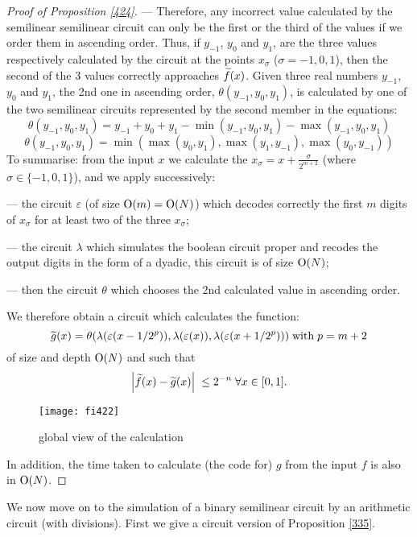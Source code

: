 \begin{proof}[Proof of Proposition \ref{424}]
\noindent 
--- Therefore, any incorrect value calculated by the semilinear 
semilinear circuit can only be the first or the third of the values if 
we order them in ascending order.
Thus, if $y_{-1}$, $y_0$ and $y_1$, are the three values respectively 
calculated by the circuit at the points $x_{\sigma}$ ($\sigma=-1,0,1$), 
then the second of the 3 values correctly approaches $\widetilde{f}(x)$. 
Given three real numbers $y_{-1}$, $y_0$ and $y_1$, the 2nd one in ascending order, $\theta(y_{-1},y_0,y_1)$, is calculated by one of the two semilinear circuits represented by the second member in the equations:
\[
\theta (y_{-1},y_0,y_1) = y_{-1}+y_0+y_1 - \min (y_{-1},y_0,y_1) - \max (y_{-1},y_0,y_1)
\]
\[
\theta (y_{-1},y_0,y_1) = \min (\max (y_0,y_1), \max (y_1,y_{-1}), \max (y_0,y_{-1}))
\]
To summarise: from the input $x$ we calculate the $x_{\sigma} = x +\frac \sigma {2^{m+2}}$ (where $\sigma \in \{-1,0,1 \}$), and we apply successively:

\noindent 
--- the circuit $\varepsilon$ (of size ${\rm O}(m) = {\rm O}(N)$) which decodes 
correctly the first $m$ digits of $x_{\sigma}$ for at least two of the three $x_{\sigma}$; 

\noindent 
--- the circuit $\lambda$ which simulates the boolean circuit proper and 
recodes the output digits in the form of a dyadic, this circuit is of size 
${\rm O}(N)$;

\noindent 
--- then the circuit $\theta$ which chooses the 2nd calculated value in 
ascending order.

\noindent 
We therefore obtain a circuit which calculates the function:
\[
\widetilde{g}(x) = \theta (\lambda(\varepsilon (x-1/2^p)),\lambda(\varepsilon (x)), \lambda(\varepsilon (x+1/2^p))) \; {\rm with} \; p = m+2
\]
of size and depth ${\rm O}(N)$ and such that
\[
\left|{ \widetilde{f}(x) - \widetilde{g}(x) }\right|\;  \leq 2^{-n} \; \forall x \in 
[0,1].
\]
\begin{figure}[htbp] 
\begin{center}
\texttt{[image: fi422]}
\end{center}
\caption[global view of the calculation]{\label{fi422} 
global view of the calculation} 
\end{figure} 
\noindent In addition, the time taken to calculate (the code for) $g$ from the 
input $f$ is also in ${\rm O}(N)$. 
\end{proof}

We now move on to the simulation of a binary semilinear circuit by an arithmetic circuit (with divisions). First we give a circuit version of  Proposition \ref{335}.

